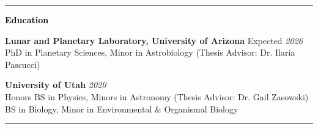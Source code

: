 \documentclass{resume} %
\newcommand{\mystrut}{\rule[-.3\baselineskip]{0pt}{\baselineskip}}
\newcommand{\cvline}[1]{\vspace*{\dimexpr-\parskip-0.3\baselineskip}\noindent\rule{\textwidth}{0.4pt}\vspace*{\dimexpr-0.3\parskip-0\baselineskip}}
\renewenvironment{rSection}[1]{\mystrut{\textcolor{black}{{\large{\textbf{#1}}}}}
\vspace{-5pt} %
\begin{list}{}{
\setlength{\leftmargin}{0em}
}
\item[]
}{
\end{list}
}
\begin{document}
\thispagestyle{empty}
\cvline{}



\begin{rSection}{Education}

{\bf Lunar and Planetary Laboratory, University of Arizona} \hfill {Expected \em 2026} 
\\ PhD in Planetary Sciences, Minor in Astrobiology (Thesis Advisor: Dr. Ilaria Pascucci) \hfill \vspace{-5pt}

{\bf University of Utah} \hfill {\em 2020} 
\\ Honors BS in Physics, Minors in Astronomy (Thesis Advisor: Dr. Gail Zasowski) \hfill
\\ BS in Biology, Minor in Environmental \& Organismal Biology \hfill
\end{rSection}
\cvline{}



\end{document}
